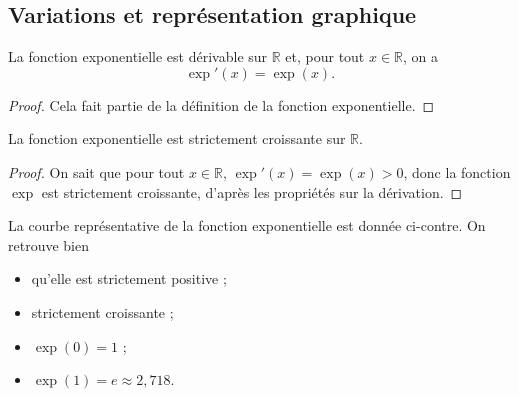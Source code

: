 \documentclass[11pt]{article}
\begin{document}
\subsection{Variations et représentation graphique}
\begin{prop}
  La fonction exponentielle est dérivable sur $\mathbb{R}$ et, pour tout
  $x\in\mathbb{R}$, on a
  \[
    \exp'(x) = \exp(x).
  \]
\end{prop}
\begin{proof}
  Cela fait partie de la définition de la fonction exponentielle.
\end{proof}
\begin{prop}
  La fonction exponentielle est strictement croissante sur
  $\mathbb{R}$.\\[-3mm]
\begin{center}
\end{center}
\end{prop}
\begin{proof}
  On sait que pour tout $x\in\mathbb{R}$, $\exp'(x)=\exp(x)>0$, donc la fonction
  $\exp$ est strictement croissante, d'après les propriétés sur la dérivation.
\end{proof}
\begin{prop}
  \begin{minipage}[]{.5\textwidth}
    La courbe représentative de la fonction exponentielle est donnée ci-contre.
    On retrouve bien
    \begin{itemize}
      \item qu'elle est strictement positive ;
      \item strictement croissante ;
      \item $\exp(0)=1$ ;
      \item $\exp(1)=e\approx2,718$.
    \end{itemize}
  \end{minipage}
  \begin{minipage}[]{.5\textwidth}
  \begin{center}
  \end{center}
  \end{minipage}
\end{prop}
\end{document}
